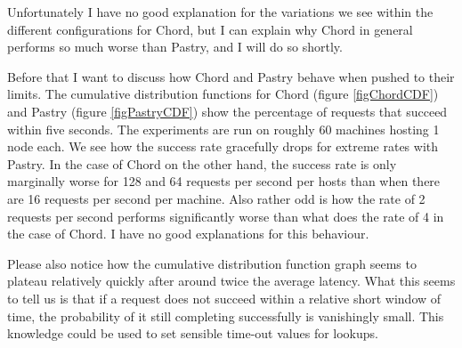 Unfortunately I have no good explanation for the variations we see within the different configurations for Chord, but I can explain why Chord in general performs so much worse than Pastry, and I will do so shortly.

Before that I want to discuss how Chord and Pastry behave when pushed to their limits. The cumulative distribution functions for Chord (figure \ref{figChordCDF}) and Pastry (figure \ref{figPastryCDF}) show the percentage of requests that succeed within five seconds. The experiments are run on roughly 60 machines hosting 1 node each. We see how the success rate gracefully drops for extreme rates with Pastry.
In the case of Chord on the other hand, the success rate is only marginally worse for 128 and 64 requests per second per hosts than when there are 16 requests per second per machine. Also rather odd is how the rate of 2 requests per second performs significantly worse than what does the rate of 4 in the case of Chord. I have no good explanations for this behaviour.

Please also notice how the cumulative distribution function graph seems to plateau relatively quickly after around twice the average latency. What this seems to tell us is that if a request does not succeed within a relative short window of time, the probability of it still completing successfully is vanishingly small. This knowledge could be used to set sensible time-out values for lookups.

